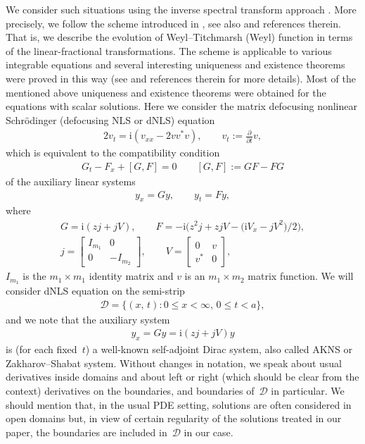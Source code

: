 \documentclass[pdftex]{sigma}
\def\p{\partial}
\newcommand{\I}{\mathrm{i}}
\newcommand{\cD}{{\mathcal D}}
\numberwithin{equation}{section}
\begin{document}
We consider such situations using the inverse spectral transform approach \cite{Ber, BerG, Kv}.
More precisely, we follow the scheme introduced in \cite{Sa88, SaLev2}, see also \cite[Chapter~12]{Sa99}
and references therein. That is, we describe the evolution of Weyl--Titchmarsh (Weyl) function in terms of the linear-fractional transformations.
The scheme is applicable to various integrable equations
and several interesting uniqueness and existence theorems were proved in this way (see \cite[Chapter~6]{SaSaR}
and references therein for more details). Most of the mentioned above uniqueness and existence theorems
were obtained for the equations with scalar solutions. Here we consider
the matrix defocusing nonlinear Schr\"odinger (defocusing NLS or dNLS) equation
\begin{gather} \label{1.1}
2v_t=\I(v_{xx}-2vv^*v), \qquad v_t:=\frac{\p}{\p t}v ,
\end{gather}
which is equivalent \cite{ZS1, ZS2} to the compatibility condition
\begin{gather} \label{zc}
G_t-F_x+[G,F]=0 \qquad [G,F]:=GF-FG
\end{gather}
of the auxiliary linear systems
\begin{gather} \label{au}
y_x=Gy, \qquad y_t=Fy,
\end{gather}
where
\begin{gather} \label{1.2}
G=\I (zj+jV), \qquad
F=-\I\big(z^2 j+ z jV-\big(\I V_x-jV^2\big)/2\big), \\
\label{1.3}
j = \left[
\begin{matrix}
I_{m_1} & 0 \\ 0 & -I_{m_2}
\end{matrix}
\right], \qquad V= \left[\begin{matrix}
0&v\\v^{*}&0\end{matrix}\right],
\end{gather}
$I_{m_1}$ is the $m_1\times m_1$ identity matrix and $v$ is an $m_1\times m_2$ matrix function.
We will consider dNLS equation on the semi-strip
\begin{gather}  \label{1.4}
{\mathcal D}=\{(x,\, t)\colon 0 \leq x <\infty, \, 0\leq t<a\},
\end{gather}
and we note that the auxiliary system
\begin{gather} \label{1.5}
y_x=Gy=\I(zj+jV)y
\end{gather}
is (for each f\/ixed~$t$) a well-known self-adjoint Dirac system, also called AKNS or Zakharov--Shabat system.
Without changes in notation, we speak about usual derivatives inside domains
and about left or right
(which should be clear from the context) derivatives
on the boundaries, and boundaries of~$\cD$ in particular.
We should mention that, in the usual PDE setting, solutions are often considered in open domains
but, in view of certain regularity of the solutions treated in our paper, the boundaries are included
in~${\mathcal D}$ in our case.
\end{document}
